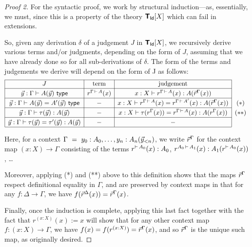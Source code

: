 \begin{proof}[Proof 2] For the syntactic proof, we work by structural induction---as, essentially, we must, since this is a property of the theory $\textbf{\textsf{T}}_{\mathsf{Id}}[X]$ which can fail in extensions.

So, given any derivation $\delta$ of a judgement $J$ in $\textbf{\textsf{T}}_{\mathsf{Id}}[X]$, we recursively derive various terms and/or judgments, depending on the form of $J$, assuming that we have already done so for all sub-derivations of $\delta$.  The form of the terms and judgements we derive will depend on the form of J as follows:
\[\begin{array}{|c|c|c|c}
\cline{1-3} \rule[-1ex]{0ex}{3.1ex}
J & \textrm{term} & \textrm{judgement} & \\ 

\cline{1-3}  \rule[-1ex]{0ex}{3.5ex} 
\y:\Gamma \types A(\y)\ \type & r^{\Gamma \,\types\, A}(x) & x:X \types r^{\Gamma \,\types\, A}(x) : A(\r^\Gamma (x)) & \\ 

\cline{1-3}  \rule[-1ex]{0ex}{3.5ex} 
\y:\Gamma \types A(\y) = A'(\y) \ \type & - & x:X \types r^{\Gamma \,\types\, A}(x) = r^{\Gamma \,\types\, A'}(x) : A(\r^\Gamma (x)) & (*) \\

\cline{1-3}  \rule[-1ex]{0ex}{3.5ex} 
\y:\Gamma \types \tau(\y) : A(\y) & - & x:X \types \tau(r^\Gamma (x)) = r^{\Gamma \,\types\, A} (x) : A(r^\Gamma (x)) & (**) \\ 

\cline{1-3}  \rule[-1ex]{0ex}{3.5ex} 
\y:\Gamma \types \tau(\y) = \tau'(\y) : A(\y) & - & - & \\ 

\cline{1-3} \end{array}\]

Here, for a context $\Gamma\ =\ y_0:A_0, \ldots, y_n : A_n(\vec y_{< n})$, we write $\vec r^\Gamma$ for the context map $(x:X) \to \Gamma$ consisting of the terms $r^{\vdash\,A_0}(x) : A_0$, $r^{A_0\, \vdash\, A_1}(x) : A_1(r^{\vdash\,A_0}(x))$, \ldots %

Moreover, applying (*) and (**) above to this definition shows that the maps $\vec r^\Gamma$ respect definitional equality in $\Gamma$, and are preserved by context maps in that for any $f \colon \Delta \to \Gamma$, we have $f(\vec r^\Delta (x)) = \vec r^\Gamma (x)$.

Finally, once the induction is complete, applying this last fact together with the fact that $r^{(x:X)}(x) := x$ will show that for any other context map $f \colon (x:X) \to \Gamma$, we have $f(x) = f(r^{(x:X)}) = \vec r^\Gamma (x)$, and so $\vec r^\Gamma$ is the unique such map, as originally desired.


\end{proof}
